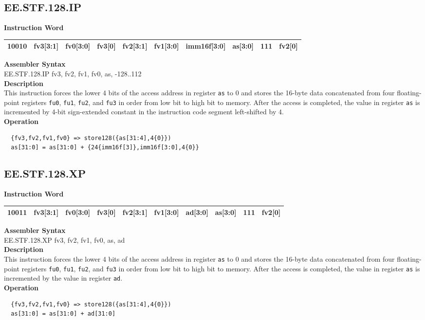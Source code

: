 \clearpage
\subsection{EE.STF.128.IP}\label{instruction:EESTF128IP}
\setlength\tabcolsep{6pt}
\textbf{Instruction Word} \\
\begin{tabular}{|c|c|c|c|c|c|c|c|c|c|}
	\hline
	10010 & fv3[3:1] & fv0[3:0] & fv3[0] & fv2[3:1] & fv1[3:0] & imm16f[3:0] & as[3:0] & 111 & fv2[0] \\
	\hline
\end{tabular}

\textbf{Assembler Syntax} \\
EE.STF.128.IP fv3, fv2, fv1, fv0, as, -128..112 \\
\textbf{Description} \\
This instruction forces the lower 4 bits of the access address in register \lstinline{as} to 0 and stores the 16-byte data concatenated from four floating-point registers \lstinline{fu0}, \lstinline{fu1}, \lstinline{fu2}, and \lstinline{fu3} in order from low bit to high bit to memory. After the access is completed, the value in register \lstinline{as} is incremented by 4-bit sign-extended constant in the instruction code segment left-shifted by 4.\\
\textbf{Operation}
\begin{lstlisting}
  {fv3,fv2,fv1,fv0} => store128({as[31:4],4{0}})
  as[31:0] = as[31:0] + {24{imm16f[3]},imm16f[3:0],4{0}}
\end{lstlisting}

\clearpage
\subsection{EE.STF.128.XP}\label{instruction:EESTF128XP}
\setlength\tabcolsep{6pt}
\textbf{Instruction Word} \\
\begin{tabular}{|c|c|c|c|c|c|c|c|c|c|}
	\hline
	10011 & fv3[3:1] & fv0[3:0] & fv3[0] & fv2[3:1] & fv1[3:0] & ad[3:0] & as[3:0] & 111 & fv2[0] \\
	\hline
\end{tabular}

\textbf{Assembler Syntax} \\
EE.STF.128.XP fv3, fv2, fv1, fv0, as, ad \\
\textbf{Description} \\
This instruction forces the lower 4 bits of the access address in register \lstinline{as} to 0 and stores the 16-byte data concatenated from four floating-point registers \lstinline{fu0}, \lstinline{fu1}, \lstinline{fu2}, and \lstinline{fu3} in order from low bit to high bit to memory. After the access is completed, the value in register \lstinline{as} is incremented by the value in register \lstinline{ad}.\\
\textbf{Operation}
\begin{lstlisting}
  {fv3,fv2,fv1,fv0} => store128({as[31:4],4{0}})
  as[31:0] = as[31:0] + ad[31:0]
\end{lstlisting}


